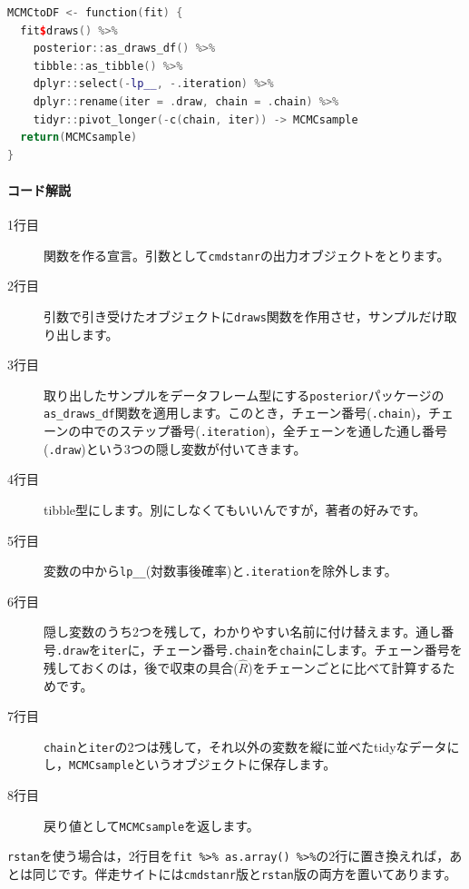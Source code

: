 \documentclass{ltjsbook}
\begin{document}
\begin{lstlisting}[language=C++,label={code:04_04},caption={MCMCtoDF関数(cmdstanr版)}]
MCMCtoDF <- function(fit) {
  fit$draws() %>%
    posterior::as_draws_df() %>%
    tibble::as_tibble() %>%
    dplyr::select(-lp__, -.iteration) %>%
    dplyr::rename(iter = .draw, chain = .chain) %>%
    tidyr::pivot_longer(-c(chain, iter)) -> MCMCsample
  return(MCMCsample)
}
\end{lstlisting}
\paragraph{コード解説}
\begin{description}
	\item[1行目] 関数を作る宣言。引数として\verb|cmdstanr|の出力オブジェクトをとります。
	\item[2行目] 引数で引き受けたオブジェクトに\verb|draws|関数を作用させ，サンプルだけ取り出します。
	\item[3行目] 取り出したサンプルをデータフレーム型にする\verb|posterior|パッケージの\verb|as_draws_df|関数を適用します。このとき，チェーン番号(\verb|.chain|)，チェーンの中でのステップ番号(\verb|.iteration|)，全チェーンを通した通し番号(\verb|.draw|)という3つの隠し変数が付いてきます。
	\item[4行目] tibble型にします。別にしなくてもいいんですが，著者の好みです。
	\item[5行目] 変数の中から\verb|lp__|(対数事後確率)と\verb|.iteration|を除外します。
	\item[6行目] 隠し変数のうち2つを残して，わかりやすい名前に付け替えます。通し番号\verb|.draw|を\verb|iter|に，チェーン番号\verb|.chain|を\verb|chain|にします。チェーン番号を残しておくのは，後で収束の具合(\(\hat{R}\))をチェーンごとに比べて計算するためです。
	\item[7行目] \verb|chain|と\verb|iter|の2つは残して，それ以外の変数を縦に並べたtidyなデータにし，\verb|MCMCsample|というオブジェクトに保存します。
	\item[8行目] 戻り値として\verb|MCMCsample|を返します。
\end{description}

\verb|rstan|を使う場合は，2行目を\verb|fit %>% as.array() %>%|の2行に置き換えれば，あとは同じです。伴走サイトには\verb|cmdstanr|版と\verb|rstan|版の両方を置いてあります。
\end{document}
